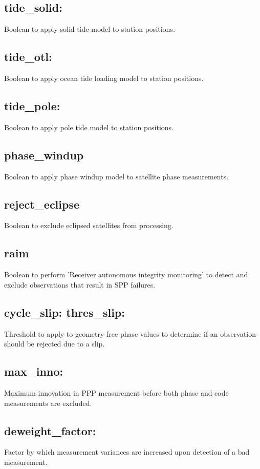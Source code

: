 \subsection*{tide\_solid:}
Boolean to apply solid tide model to station positions.

\subsection*{tide\_otl:}
Boolean to apply ocean tide loading model to station positions.

\subsection*{tide\_pole:}
Boolean to apply pole tide model to station positions.

\subsection*{phase\_windup}
Boolean to apply phase windup model to satellite phase measurements.

\subsection*{reject\_eclipse}
Boolean to exclude eclipsed satellites from processing.

\subsection*{raim}
Boolean to perform 'Receiver autonomous integrity monitoring' to detect and exclude observations that result in SPP failures.

\subsection*{cycle\_slip: thres\_slip:}
Threshold to apply to geometry free phase values to determine if an observation should be rejected due to a slip.

\subsection*{max\_inno:}
Maximum innovation in PPP measurement before both phase and code measurements are excluded.

\subsection*{deweight\_factor:}
Factor by which measurement variances are increased upon detection of a bad measurement.

